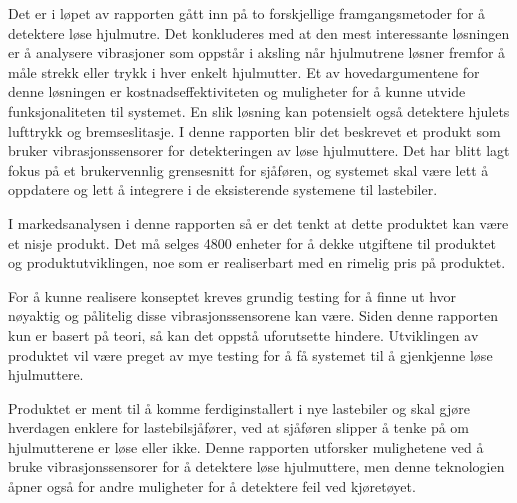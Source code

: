 Det er i løpet av rapporten gått inn på to forskjellige framgangsmetoder for å detektere
løse hjulmutre. Det konkluderes med at den mest interessante løsningen er å analysere
vibrasjoner som oppstår i aksling når hjulmutrene løsner fremfor å måle strekk eller trykk i 
hver enkelt hjulmutter. Et av hovedargumentene for denne løsningen er kostnadseffektiviteten og 
muligheter for å kunne utvide funksjonaliteten til systemet. En slik løsning kan potensielt 
også detektere hjulets lufttrykk og bremseslitasje. I denne rapporten blir det beskrevet et 
produkt som bruker vibrasjonssensorer for detekteringen av løse hjulmuttere.
Det har blitt lagt fokus på et brukervennlig grensesnitt for sjåføren, og systemet skal være
lett å oppdatere og lett å integrere i de eksisterende systemene til lastebiler. 

I markedsanalysen i denne rapporten så er det tenkt at dette produktet kan være et nisje produkt. 
Det må selges 4800 enheter for å dekke utgiftene til produktet og produktutviklingen, noe som
er realiserbart med en rimelig pris på produktet.

For å kunne realisere konseptet kreves grundig testing for å finne ut hvor nøyaktig og pålitelig 
disse vibrasjonssensorene kan være. Siden denne rapporten kun er basert på teori, så kan det 
oppstå uforutsette hindere. Utviklingen av produktet vil være preget av mye testing for å få 
systemet til å gjenkjenne løse hjulmuttere.

Produktet er ment til å komme ferdiginstallert i nye lastebiler og skal gjøre hverdagen enklere for 
lastebilsjåfører, ved at sjåføren slipper å tenke på om hjulmutterene er løse eller ikke. Denne
rapporten utforsker mulighetene ved å bruke vibrasjonssensorer for å detektere løse hjulmuttere,
men denne teknologien åpner også for andre muligheter for å detektere feil ved kjøretøyet.